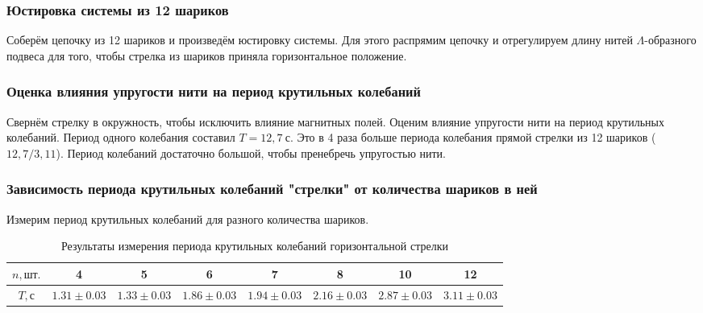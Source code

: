 \documentclass[a4paper, 12pt]{article}
\begin{document}
            \subsubsection{Юстировка системы из 12 шариков}

                Соберём цепочку из 12 шариков и произведём юстировку системы. Для этого распрямим цепочку и отрегулируем длину нитей $\Lambda$-образного подвеса для того, чтобы стрелка из шариков приняла горизонтальное положение.

            \subsubsection{Оценка влияния упругости нити на период крутильных колебаний}

                Свернём стрелку в окружность, чтобы исключить влияние магнитных полей. Оценим влияние упругости нити на период крутильных колебаний. Период одного колебания составил $T = 12,7~с$.  Это в 4 раза больше периода колебания прямой стрелки из 12 шариков ($12,7 / 3,11$). Период колебаний достаточно большой, чтобы пренебречь упругостью нити.

            \subsubsection{Зависимость периода крутильных колебаний "стрелки" от количества шариков в ней}

                Измерим период крутильных колебаний для разного количества шариков.

                \begin{table}[!ht]
                    \centering
                    \begin{tabular}{|c|c|c|c|c|c|c|c|}
                        \hline

                        $n, шт.$ & 4 & 5 & 6 & 7 & 8 & 10 & 12\\ \hline
                        $T, с$ & $1.31 \pm 0.03$ & $1.33 \pm 0.03$ & $1.86 \pm 0.03$ & $1.94 \pm 0.03$ & $2.16 \pm 0.03$ & $2.87 \pm 0.03$ & $3.11 \pm 0.03$\\ \hline

                    \end{tabular}
                    \caption{Результаты измерения периода крутильных колебаний горизонтальной стрелки}
                    \label{table:arrow_horizontal}
                \end{table}
\end{document}
